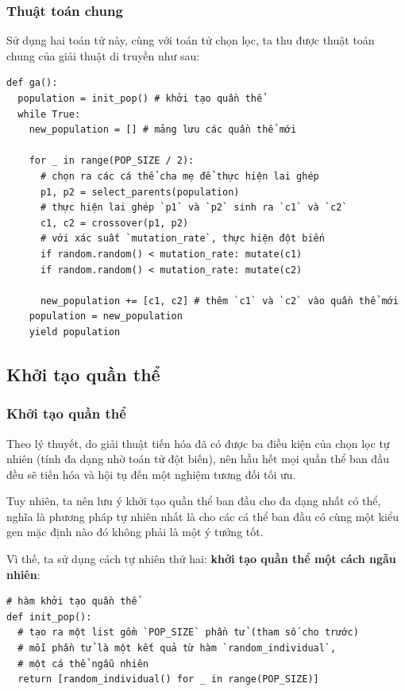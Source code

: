 \begin{frame}[fragile]
\frametitle{Thuật toán chung}
  Sử dụng hai toán tử này, cùng với toán tử chọn lọc, ta thu được thuật toán
  chung của giải thuật di truyền như sau:
\begin{verbatim}
def ga():
  population = init_pop() # khởi tạo quần thể
  while True:
    new_population = [] # mảng lưu các quần thể mới

    for _ in range(POP_SIZE / 2):
      # chọn ra các cá thể cha mẹ để thực hiện lai ghép
      p1, p2 = select_parents(population)
      # thực hiện lai ghép `p1` và `p2` sinh ra `c1` và `c2`
      c1, c2 = crossover(p1, p2)
      # với xác suất `mutation_rate`, thực hiện đột biến
      if random.random() < mutation_rate: mutate(c1)
      if random.random() < mutation_rate: mutate(c2)

      new_population += [c1, c2] # thêm `c1` và `c2` vào quần thể mới
    population = new_population
    yield population
\end{verbatim}
\end{frame}


\subsection{Khởi tạo quần thể} %
\label{sub:Khởi tạo quần thể}

\begin{frame}[fragile]
\frametitle{Khởi tạo quần thể}
Theo lý thuyết, do giải thuật tiến hóa đã có được ba điều kiện của chọn lọc tự
nhiên (tính đa dạng nhờ toán tử đột biến), nên hầu hết mọi quần thể ban đầu đều
sẽ tiến hóa và hội tụ đến một nghiệm tương đối tối ưu.

Tuy nhiên, ta nên lưu ý khởi tạo quần thể ban đầu cho đa dạng nhất có thể, nghĩa
là phương pháp tự nhiên nhất là cho các cá thể ban đầu có cùng một kiểu gen mặc
định nào đó không phải là một ý tưởng tốt.

Vì thế, ta sử dụng cách tự nhiên thứ hai: \textbf{khởi tạo quần thể một cách
ngẫu nhiên}:
\begin{verbatim}
# hàm khởi tạo quần thể
def init_pop():
  # tạo ra một list gồm `POP_SIZE` phần tử (tham số cho trước)
  # mỗi phần tử là một kết quả từ hàm `random_individual`,
  # một cá thể ngẫu nhiên
  return [random_individual() for _ in range(POP_SIZE)]

\end{verbatim}
\end{frame}

